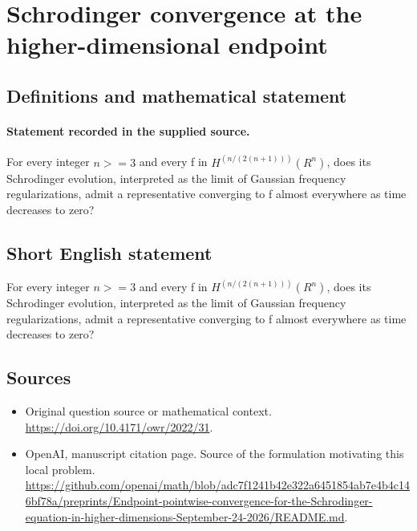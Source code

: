 \documentclass[11pt]{article}
\begin{document}
\section*{Schrodinger convergence at the higher-dimensional endpoint}\label{30007435}
\subsection{Definitions and mathematical statement}
\paragraph{Statement recorded in the supplied source.}
For every integer $n>=3$ and every f in $H^(n/(2(n+1)))(R^n)$, does its Schrodinger evolution, interpreted as the limit of Gaussian frequency regularizations, admit a representative converging to f almost everywhere as time decreases to zero?
\subsection{Short English statement}
For every integer $n>=3$ and every f in $H^(n/(2(n+1)))(R^n)$, does its Schrodinger evolution, interpreted as the limit of Gaussian frequency regularizations, admit a representative converging to f almost everywhere as time decreases to zero?
\subsection{Sources}
\begin{itemize}
\item[S1] Original question source or mathematical context.
\url{https://doi.org/10.4171/owr/2022/31}.
\item[S2] OpenAI, manuscript citation page. Source of the formulation motivating this local problem.
\url{https://github.com/openai/math/blob/adc7f1241b42e322a6451854ab7e4b4c146bf78a/preprints/Endpoint-pointwise-convergence-for-the-Schrodinger-equation-in-higher-dimensions-September-24-2026/README.md}.
\end{itemize}
\end{document}
